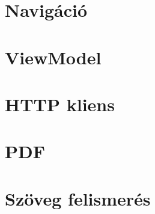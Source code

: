 \section{Navigáció}


\section{ViewModel}


\section{HTTP kliens}


\section{PDF}


\section{Szöveg felismerés}

